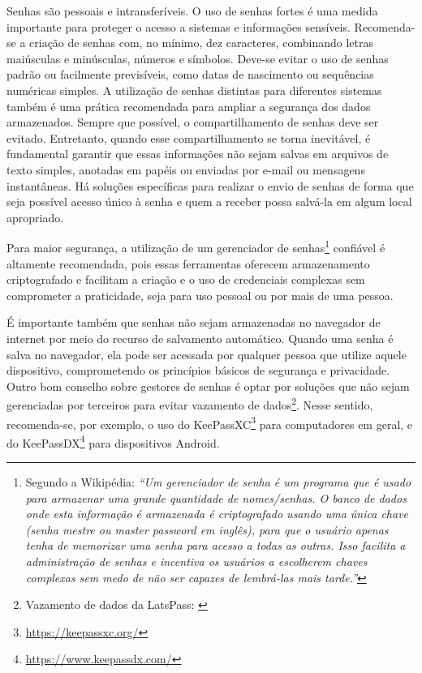 Senhas são pessoais e intransferíveis. O uso de senhas fortes é uma medida importante para proteger o acesso a sistemas e informações sensíveis. Recomenda-se a criação de senhas com, no mínimo, dez caracteres, combinando letras maiúsculas e minúsculas, números e símbolos. Deve-se evitar o uso de senhas padrão ou facilmente previsíveis, como datas de nascimento ou sequências numéricas simples. A utilização de senhas distintas para diferentes sistemas também é uma prática recomendada para ampliar a segurança dos dados armazenados. Sempre que possível, o compartilhamento de senhas deve ser evitado. Entretanto, quando esse compartilhamento se torna inevitável, é fundamental garantir que essas informações não sejam salvas em arquivos de texto simples, anotadas em papéis ou enviadas por e-mail ou mensagens instantâneas. Há soluções específicas para realizar o envio de senhas de forma que seja possível acesso único à senha e quem a receber possa salvá-la em algum local apropriado.

Para maior segurança, a utilização de um gerenciador de senhas\footnote{Segundo a Wikipédia: \textit{``Um gerenciador de senha é um programa que é usado para armazenar uma grande quantidade de nomes/senhas. O banco de dados onde esta informação é armazenada é criptografado usando uma única chave (senha mestre ou \foreignlanguage{english}{master password} em inglês), para que o usuário apenas tenha de memorizar uma senha para acesso a todas as outras. Isso facilita a administração de senhas e incentiva os usuários a escolherem chaves complexas sem medo de não ser capazes de lembrá-las mais tarde.''}\cite{wikipediaGerenciadorSenha}} confiável é altamente recomendada, pois essas ferramentas oferecem armazenamento criptografado e facilitam a criação e o uso de credenciais complexas sem comprometer a praticidade, seja para uso pessoal ou por mais de uma pessoa.

É importante também que senhas não sejam armazenadas no navegador de internet por meio do recurso de salvamento automático. Quando uma senha é salva no navegador, ela pode ser acessada por qualquer pessoa que utilize aquele dispositivo, comprometendo os princípios básicos de segurança e privacidade. Outro bom conselho sobre gestores de senhas é optar por soluções que não sejam gerenciadas por terceiros para evitar vazamento de dados\footnote{Vazamento de dados da LatsPass: \cite{goodin_lastpass_2022} \cite{vinton_lastpass_2015}}. Nesse sentido, recomenda-se, por exemplo, o uso do KeePassXC\footnote{\url{https://keepassxc.org/}} para computadores em geral, e do KeePassDX\footnote{\url{https://www.keepassdx.com/}} para dispositivos Android.

